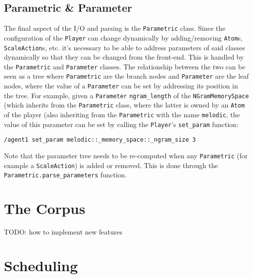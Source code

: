 
\subsection{Parametric \& Parameter}\label{ssec:2-parameters}
The final aspect of the I/O and parsing is the \texttt{Parametric} class. Since the configuration of the \texttt{Player} can change dynamically by adding/removing \texttt{Atom}s, \texttt{ScaleAction}s, etc. it's necessary to be able to address parameters of said classes dynamically so that they can be changed from the front-end. This is handled by the \texttt{Parametric} and \texttt{Parameter} classes. The relationship between the two can be seen as a tree where \texttt{Parametric} are the branch nodes and \texttt{Parameter} are the leaf nodes, where the value of a \texttt{Parameter} can be set by addressing its position in the tree. For example, given a \texttt{Parameter} \texttt{ngram\_length} of the \texttt{NGramMemorySpace} (which inherits from the \texttt{Parametric} class, where the latter is owned by an \texttt{Atom} of the player (also inheriting from the \texttt{Parametric} with the name \texttt{melodic}, the value of this parameter can be set by calling the \texttt{Player}'s \texttt{set\_param} function:
\begin{lstlisting}
/agent1 set_param melodic::_memory_space::_ngram_size 3
\end{lstlisting}
Note that the parameter tree needs to be re-computed when any \texttt{Parametric} (for example a \texttt{ScaleAction}) is added or removed. This is done through the \texttt{Parametric.parse\_parameters} function.



\section{The Corpus}\label{ssec:2-corpus}
TODO: how to implement new features


\section{Scheduling}\label{ssec:2-scheduling}

